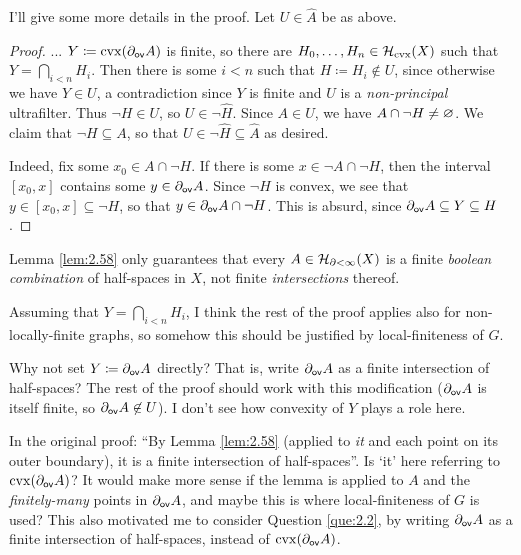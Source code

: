 \documentclass{amsart}
\begin{document}
    I'll give some more details in the proof. Let $U\in\widehat{A}$ be as above.

    \begin{proof}
        ... $Y\coloneqq\cvx(\del_\sf{ov}A)$ is finite, so there are $H_0,\dots,H_n\in\mc{H}_\textrm{cvx}(X)$ such that $Y=\bigcap_{i<n}H_i$. Then there is some $i<n$ such that $H\coloneqq H_i\not\in U$, since otherwise we have $Y\in U$, a contradiction since $Y$ is finite and $U$ is a \textit{non-principal} ultrafilter. Thus $\lnot H\in U$, so $U\in\lnot\widehat{H}$. Since $A\in U$, we have $A\cap\lnot H\neq\em$. We claim that $\lnot H\subseteq A$, so that $U\in\lnot\widehat{H}\subseteq\widehat{A}$ as desired.

        Indeed, fix some $x_0\in A\cap\lnot H$. If there is some $x\in\lnot A\cap\lnot H$, then the interval $[x_0,x]$ contains some $y\in\del_\sf{ov}A$. Since $\lnot H$ is convex, we see that $y\in[x_0,x]\subseteq\lnot H$, so that $y\in\del_\sf{ov}A\cap\lnot H$. This is absurd, since $\del_\sf{ov}A\subseteq Y\subseteq H$.
    \end{proof}

    \begin{question}
        Lemma \ref{lem:2.58} only guarantees that every $A\in\mc{H}_{\del<\infty}(X)$ is a finite \textit{boolean combination} of half-spaces in $X$, not finite \textit{intersections} thereof.

        Assuming that $Y=\bigcap_{i<n}H_i$, I think the rest of the proof applies also for non-locally-finite graphs, so somehow this should be justified by local-finiteness of $G$.
    \end{question}

    \begin{question}\label{que:2.2}
        Why not set $Y\coloneqq\del_\sf{ov}A$ directly? That is, write $\del_\sf{ov}A$ as a finite intersection of half-spaces? The rest of the proof should work with this modification ($\del_\sf{ov}A$ is itself finite, so $\del_\sf{ov}A\not\in U$). I don't see how convexity of $Y$ plays a role here.
    \end{question}

    \begin{question}
        In the original proof: ``By Lemma \ref{lem:2.58} (applied to \textit{it} and each point on its outer boundary), it is a finite intersection of half-spaces''. Is `it' here referring to $\cvx(\del_\sf{ov}A)$? It would make more sense if the lemma is applied to $A$ and the \textit{finitely-many} points in $\del_\sf{ov}A$, and maybe this is where local-finiteness of $G$ is used? This also motivated me to consider Question \ref{que:2.2}, by writing $\del_\sf{ov}A$ as a finite intersection of half-spaces, instead of $\cvx(\del_\sf{ov}A)$.
    \end{question}
\end{document}
